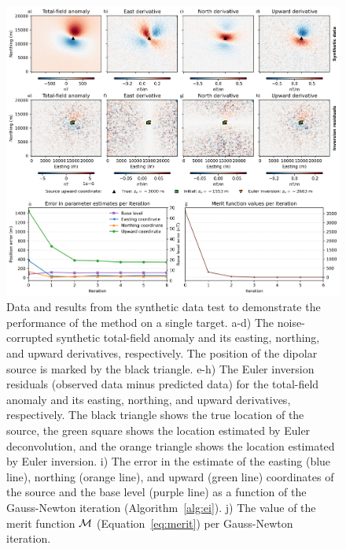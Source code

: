 \begin{figure}[tb!]
\centering
\includegraphics[width=1\linewidth]{figures/synthetic-proof-of-concept.png}
\caption{
    Data and results from the synthetic data test to demonstrate the performance of the method on a single target.
    a-d) The noise-corrupted synthetic total-field anomaly and its easting, northing, and upward derivatives, respectively. The position of the dipolar source is marked by the black triangle.
    e-h) The Euler inversion residuals (observed data minus predicted data) for the total-field anomaly and its easting, northing, and upward derivatives, respectively. The black triangle shows the true location of the source, the green square shows the location estimated by Euler deconvolution, and the orange triangle shows the location estimated by Euler inversion.
    i) The error in the estimate of the easting (blue line), northing (orange line), and upward (green line) coordinates of the source and the base level (purple line) as a function of the Gauss-Newton iteration (Algorithm~\ref{alg:ei}).
    j) The value of the merit function $\operatorname{\mathcal{M}}$ (Equation~\ref{eq:merit}) per Gauss-Newton iteration.
}
\label{fig:proof}
\end{figure}

